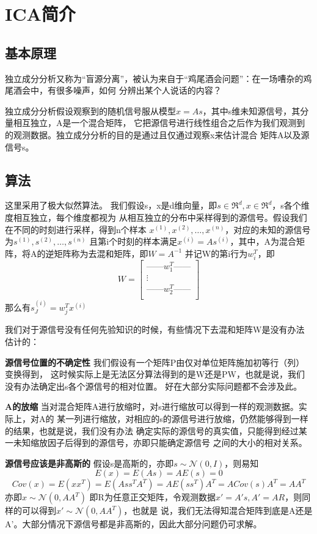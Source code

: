 \documentclass{article}
\begin{document}
\section{ICA简介}
\subsection{基本原理}
独立成分分析又称为“盲源分离”，被认为来自于“鸡尾酒会问题”：在一场嘈杂的鸡尾酒会中，有很多噪声，如何
分辨出某个人说话的内容？

独立成分分析假设观察到的随机信号服从模型$x=As$，其中s维未知源信号，其分量相互独立，A是一个混合矩阵，
它把源信号进行线性组合之后作为我们观测到的观测数据。独立成分分析的目的是通过且仅通过观察x来估计混合
矩阵A以及源信号s。

\subsection{算法}
这里采用了极大似然算法。
我们假设s，x是d维向量，即$s \in {\Re}^d, x \in {\Re}^d $，s各个维度相互独立，每个维度都视为
从相互独立的分布中采样得到的源信号。假设我们在不同的时刻进行采样，得到n个样本
$x^{(1)}, x^{(2)}, \ldots, x^{(n)}$，对应的未知的源信号为$s^{(1)}, s^{(2)}, \ldots, s^{(n)}$
且第i个时刻的样本满足$x^{(i)} = As^{(i)}$，其中，A为混合矩阵，将A的逆矩阵称为去混和矩阵，即$W=A^{-1}$
并记W的第i行为$w^T_i$，即
\begin{equation}
    W = \begin{bmatrix}
        ——w_1^T—— \\
        \vdots \\
        ——w_2^T—— \\
    \end{bmatrix}
\end{equation}
那么有$s_J^{(i)} = w_j^Tx^{(i)}$

我们对于源信号没有任何先验知识的时候，有些情况下去混和矩阵W是没有办法估计的：

\textbf{源信号位置的不确定性} 我们假设有一个矩阵P由仅对单位矩阵施加初等行（列）变换得到，
这时候实际上是无法区分算法得到的是W还是PW，也就是说，我们没有办法确定出s各个源信号的相对位置。
好在大部分实际问题都不会涉及此。

\textbf{A的放缩} 当对混合矩阵A进行放缩时，对s进行缩放可以得到一样的观测数据。实际上，对A的
某一列进行缩放，对相应的s的源信号进行放缩，仍然能够得到一样的结果，也就是说，我们没有办法
确定实际的源信号的真实值，只能得到经过某一未知缩放因子后得到的源信号，亦即只能确定源信号
之间的大小的相对关系。

\textbf{源信号应该是非高斯的} 假设s是高斯的，亦即$ s \sim \mathcal{N}(0, I) $，则易知
$$
    E(x) = E(As) = AE(s) = 0 
$$
$$
    Cov(x) = E(xx^T) = E(Ass^TA^T) = AE(ss^T)A^T = ACov(s)A^T = AA^T 
$$
亦即$x \sim \mathcal{N}(0, AA^T)$
即R为任意正交矩阵，令观测数据$x' = A's, A' = AR $，则同样的可以得到$x' \sim \mathcal{N}(0, AA^T)$，也就是
说，我们无法得知混合矩阵到底是A还是A'。大部分情况下源信号都是非高斯的，因此大部分问题仍可求解。
\end{document}
